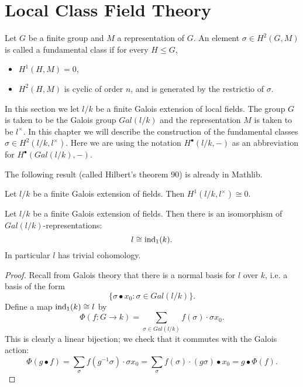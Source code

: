 \chapter{Local Class Field Theory}

Let $G$ be a finite group and $M$ a representation of $G$.
An element $\sigma \in H^2(G,M)$ is called a fundamental class if for every $H \le G$,
\begin{itemize}
	\item
	$H^1(H,M) = 0$,
	\item
	$H^2(H,M)$ is cyclic of order $n$, and is generated by the restrictio of $\sigma$.
\end{itemize}

In this section we let $l/k$ be a finite Galois extension of local fields.
The group $G$ is taken to be the Galois group $Gal(l/k)$ and the representation $M$ is
taken to be $l^\times$.
In this chapter we will describe the construction of the fundamental classes
$\sigma \in H^2(l/k,l^\times)$. Here we are using the notation $H^\bullet(l/k,-)$ as an abbreviation
for $H^\bullet(Gal(l/k),-)$.

The following result (called Hilbert's theorem 90) is already in Mathlib.

\begin{theorem}\label{thm:hilbert 90}
	\mathlibok
	Let $l/k$ be a finite Galois extension of fields.
	Then $H^1(l/k, l^\times) \cong 0$.
\end{theorem}


\begin{theorem}\label{thm:additive field trivial}
	Let $l/k$ be a finite Galois extension of fields.
	Then there is an isomorphism of $Gal(l/k)$-representations:
	\[
		l \cong \mathrm{ind}_1(k).
	\]
	In particular $l$ has trivial cohomology.
\end{theorem}

\begin{proof}
	Recall from Galois theory that there is a normal basis for $l$ over $k$, i.e. a basis of the
	form
	\[
		\{\sigma \bullet x_0 : \sigma \in Gal(l/k)\}.
	\]
	Define a map $\mathrm{ind}_1(k) \cong l$ by
	\[
		\Phi (f : G \to k) = \sum_{\sigma \in Gal(l/k)} f(\sigma) \cdot \sigma x_0.
	\]
	This is clearly a linear bijection; we check that it commutes with the Galois action:
	\[
		\Phi(g\bullet f)
		= \sum_\sigma f(g^{-1}\sigma) \cdot \sigma x_0
		= \sum_\sigma f(\sigma) \cdot (g\sigma) \bullet x_0
		= g \bullet \Phi(f).
	\]
\end{proof}



